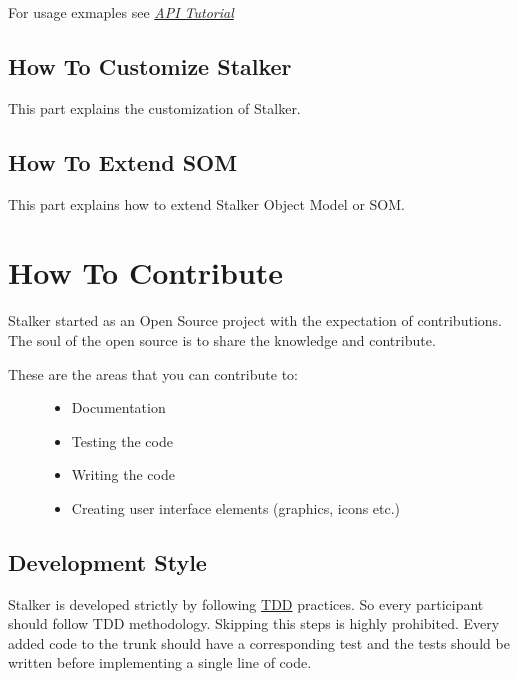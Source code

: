 \documentclass[a4paper,10pt,english]{sphinxmanual}
\begin{document}
For usage exmaples see {\hyperref[tutorial:tutorial-toplevel]{\emph{API Tutorial}}}


\section{How To Customize Stalker}
\label{design:how-to-customize-stalker}
This part explains the customization of Stalker.


\section{How To Extend SOM}
\label{design:how-to-extend-som}
This part explains how to extend Stalker Object Model or SOM.


\chapter{How To Contribute}
\label{contribute:contribute-toplevel}\label{contribute::doc}\label{contribute:how-to-contribute}
Stalker started as an Open Source project with the expectation of
contributions. The soul of the open source is to share the knowledge and
contribute.
\begin{description}
\item[{These are the areas that you can contribute to:}] \leavevmode\begin{itemize}
\item {} 
Documentation

\item {} 
Testing the code

\item {} 
Writing the code

\item {} 
Creating user interface elements (graphics, icons etc.)

\end{itemize}

\end{description}


\section{Development Style}
\label{contribute:development-style}
Stalker is developed strictly by following \href{http://en.wikipedia.org/wiki/Test-driven\_development}{TDD} practices. So every
participant should follow TDD methodology. Skipping this steps is highly
prohibited. Every added code to the trunk should have a corresponding test and
the tests should be written before implementing a single line of code.
\end{document}
